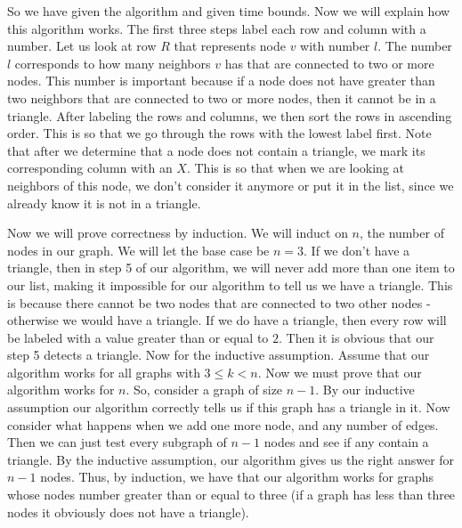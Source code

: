 \documentclass{article}
\begin{document}
\begin{description}
        So we have given the algorithm and given time bounds. Now we will
        explain how this algorithm works. The first three steps label each row
        and column with a number. Let us look at row $R$ that represents node
        $v$ with number $l$. The number $l$ corresponds to how many neighbors
        $v$ has that are connected to two or more nodes. This number is
        important because if a node does not have greater than two neighbors
        that are connected to two or more nodes, then it cannot be in a
        triangle. After labeling the rows and columns, we then sort the rows in
        ascending order. This is so that we go through the rows with the lowest
        label first. Note that after we determine that a node does not contain a
        triangle, we mark its corresponding column with an $X$. This is so that
        when we are looking at neighbors of this node, we don't consider it
        anymore or put it in the list, since we already know it is not in a
        triangle.


        Now we will prove
        correctness by induction. We will induct on $n$, the number of nodes in
        our graph. We will let the base case be $n = 3$. If we don't have a
        triangle, then in step 5 of our algorithm, we will never add more than
        one item to our list, making it impossible for our algorithm to tell us
        we have a triangle. This is because there cannot be two nodes that are
        connected to two other nodes - otherwise we would have a triangle. If we
        do have a triangle, then every row will be labeled with a value greater
        than or equal to $2$. Then it is obvious that our step 5 detects a
        triangle. Now for the inductive assumption. Assume that our algorithm
        works for all graphs with $3 \leq k < n$. Now we must prove that our
        algorithm works for $n$. So, consider a graph of size $n-1$. By our
        inductive assumption our algorithm correctly tells us if this graph has
        a triangle in it. Now consider what happens when we add one more node,
        and any number of edges. Then we can just test every subgraph of
        $n-1$ nodes and see if any contain a triangle. By the inductive
        assumption, our algorithm gives us the right answer for $n-1$ nodes.
        Thus, by induction, we have that our algorithm works for graphs whose
        nodes number greater than or equal to three (if a graph has less than
        three nodes it obviously does not have a triangle).
\end{description}
\newpage
\end{document}
